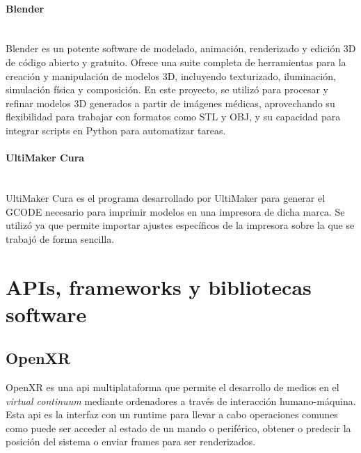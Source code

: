     \paragraph{Blender}~\\
Blender es un potente software de modelado, animación, renderizado y edición 3D de código abierto y gratuito. Ofrece una suite completa de herramientas para la creación y manipulación de modelos 3D, incluyendo texturizado, iluminación, simulación física y composición. En este proyecto, se utilizó para procesar y refinar modelos 3D generados a partir de imágenes médicas, aprovechando su flexibilidad para trabajar con formatos como STL y OBJ, y su capacidad para integrar scripts en Python para automatizar tareas.
    \paragraph{UltiMaker Cura}~\\
UltiMaker Cura es el programa desarrollado por UltiMaker para generar el GCODE necesario para imprimir modelos en una impresora de dicha marca. Se utilizó ya que permite importar ajustes específicos de la impresora sobre la que se trabajó de forma sencilla.
\section{APIs, frameworks y bibliotecas software}
\subsection{OpenXR}
OpenXR es una \acrfull{api} multiplataforma que permite el desarrollo de medios en el \textit{virtual continuum} mediante ordenadores a través de interacción humano-máquina.
Esta \acrshort{api} es la interfaz con un runtime para llevar a cabo operaciones comunes como puede ser acceder al estado de un mando o periférico, obtener o predecir la posición del sistema o enviar frames para ser renderizados.

